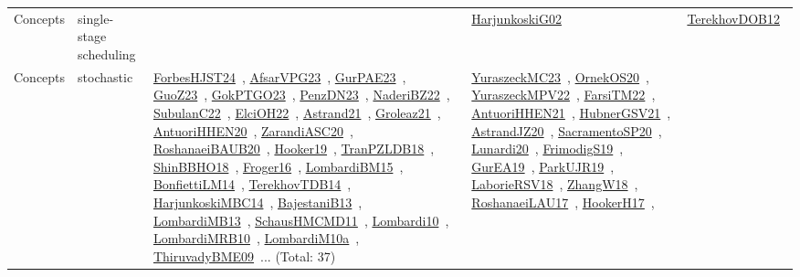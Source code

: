 {\begin{longtable}{lp{3cm}>{\raggedright\arraybackslash}p{6cm}>{\raggedright\arraybackslash}p{6cm}>{\raggedright\arraybackslash}p{8cm}}
Concepts & single-stage scheduling &  & \href{../works/HarjunkoskiG02.pdf}{HarjunkoskiG02}~\cite{HarjunkoskiG02} & \href{../works/TerekhovDOB12.pdf}{TerekhovDOB12}~\cite{TerekhovDOB12}\\
Concepts & stochastic & \href{../works/ForbesHJST24.pdf}{ForbesHJST24}~\cite{ForbesHJST24}, \href{../works/AfsarVPG23.pdf}{AfsarVPG23}~\cite{AfsarVPG23}, \href{../works/GurPAE23.pdf}{GurPAE23}~\cite{GurPAE23}, \href{../works/GuoZ23.pdf}{GuoZ23}~\cite{GuoZ23}, \href{../works/GokPTGO23.pdf}{GokPTGO23}~\cite{GokPTGO23}, \href{../works/PenzDN23.pdf}{PenzDN23}~\cite{PenzDN23}, \href{../works/NaderiBZ22.pdf}{NaderiBZ22}~\cite{NaderiBZ22}, \href{../works/SubulanC22.pdf}{SubulanC22}~\cite{SubulanC22}, \href{../works/ElciOH22.pdf}{ElciOH22}~\cite{ElciOH22}, \href{../works/Astrand21.pdf}{Astrand21}~\cite{Astrand21}, \href{../works/Groleaz21.pdf}{Groleaz21}~\cite{Groleaz21}, \href{../works/AntuoriHHEN20.pdf}{AntuoriHHEN20}~\cite{AntuoriHHEN20}, \href{../works/ZarandiASC20.pdf}{ZarandiASC20}~\cite{ZarandiASC20}, \href{../works/RoshanaeiBAUB20.pdf}{RoshanaeiBAUB20}~\cite{RoshanaeiBAUB20}, \href{../works/Hooker19.pdf}{Hooker19}~\cite{Hooker19}, \href{../works/TranPZLDB18.pdf}{TranPZLDB18}~\cite{TranPZLDB18}, \href{../works/ShinBBHO18.pdf}{ShinBBHO18}~\cite{ShinBBHO18}, \href{../works/Froger16.pdf}{Froger16}~\cite{Froger16}, \href{../works/LombardiBM15.pdf}{LombardiBM15}~\cite{LombardiBM15}, \href{../works/BonfiettiLM14.pdf}{BonfiettiLM14}~\cite{BonfiettiLM14}, \href{../works/TerekhovTDB14.pdf}{TerekhovTDB14}~\cite{TerekhovTDB14}, \href{../works/HarjunkoskiMBC14.pdf}{HarjunkoskiMBC14}~\cite{HarjunkoskiMBC14}, \href{../works/BajestaniB13.pdf}{BajestaniB13}~\cite{BajestaniB13}, \href{../works/LombardiMB13.pdf}{LombardiMB13}~\cite{LombardiMB13}, \href{../works/SchausHMCMD11.pdf}{SchausHMCMD11}~\cite{SchausHMCMD11}, \href{../works/Lombardi10.pdf}{Lombardi10}~\cite{Lombardi10}, \href{../works/LombardiMRB10.pdf}{LombardiMRB10}~\cite{LombardiMRB10}, \href{../works/LombardiM10a.pdf}{LombardiM10a}~\cite{LombardiM10a}, \href{../works/ThiruvadyBME09.pdf}{ThiruvadyBME09}~\cite{ThiruvadyBME09}... (Total: 37) & \href{../works/YuraszeckMC23.pdf}{YuraszeckMC23}~\cite{YuraszeckMC23}, \href{../works/OrnekOS20.pdf}{OrnekOS20}~\cite{OrnekOS20}, \href{../works/YuraszeckMPV22.pdf}{YuraszeckMPV22}~\cite{YuraszeckMPV22}, \href{../works/FarsiTM22.pdf}{FarsiTM22}~\cite{FarsiTM22}, \href{../works/AntuoriHHEN21.pdf}{AntuoriHHEN21}~\cite{AntuoriHHEN21}, \href{../works/HubnerGSV21.pdf}{HubnerGSV21}~\cite{HubnerGSV21}, \href{../works/AstrandJZ20.pdf}{AstrandJZ20}~\cite{AstrandJZ20}, \href{../works/SacramentoSP20.pdf}{SacramentoSP20}~\cite{SacramentoSP20}, \href{../works/Lunardi20.pdf}{Lunardi20}~\cite{Lunardi20}, \href{../works/FrimodigS19.pdf}{FrimodigS19}~\cite{FrimodigS19}, \href{../works/GurEA19.pdf}{GurEA19}~\cite{GurEA19}, \href{../works/ParkUJR19.pdf}{ParkUJR19}~\cite{ParkUJR19}, \href{../works/LaborieRSV18.pdf}{LaborieRSV18}~\cite{LaborieRSV18}, \href{../works/ZhangW18.pdf}{ZhangW18}~\cite{ZhangW18}, \href{../works/RoshanaeiLAU17.pdf}{RoshanaeiLAU17}~\cite{RoshanaeiLAU17}, \href{../works/HookerH17.pdf}{HookerH17}~\cite{HookerH17}, 
\end{longtable}}
